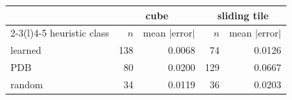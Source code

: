 \begin{tabular}{lrrrr}
\toprule
 & \multicolumn{2}{c}{cube} & \multicolumn{2}{c}{sliding tile} \\
\cmidrule(lr){2-3}\cmidrule(l){4-5}
heuristic class & $n$ & mean $|$error$|$ & $n$ & mean $|$error$|$ \\
\midrule
learned & 138 & 0.0068 & 74 & 0.0126 \\
PDB & 80 & 0.0200 & 129 & 0.0667 \\
random & 34 & 0.0119 & 36 & 0.0203 \\
\bottomrule
\end{tabular}